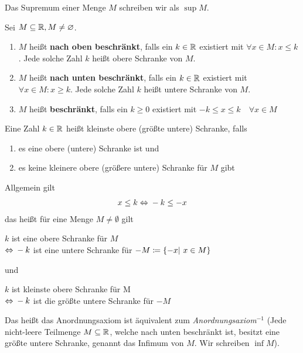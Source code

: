 \begin{notation}[Supremum]
    Das Supremum einer Menge $M$ schreiben wir als $\sup M$.
\end{notation}

\begin{definition}
    Sei $M\subseteq \mathbb{R}, M\neq \varnothing$.
    \begin{enumerate}[label=(\roman*)]
        \item $M$ heißt \textbf{nach oben beschränkt}, falls ein $k\in\mathbb{R}$ existiert mit $\forall x\in M\colon x\leq k$.
        Jede solche Zahl $k$ heißt obere Schranke von $M$.
        \item $M$ heißt \textbf{nach unten beschränkt}, falls ein $k\in\mathbb{R}$ existiert mit $\forall x\in M\colon x\geq k$.
        Jede solche Zahl $k$ heißt untere Schranke von $M$.
        \item $M$ heißt \textbf{beschränkt}, falls ein $k\geq 0$ existiert mit $-k\leq x \leq k\quad \forall x\in M$
    \end{enumerate}
\end{definition}

\begin{definition}
    Eine Zahl $k\in\mathbb{R}$ heißt kleinste obere (größte untere) Schranke, falls
    \begin{enumerate}
        \item es eine obere (untere) Schranke ist und
        \item es keine kleinere obere (größere untere) Schranke für $M$ gibt
    \end{enumerate}
\end{definition}

\begin{folgerung}
    \theoremescape
    Allgemein gilt
    \begin{align*}
        x \leq k \Leftrightarrow{} -k \leq -x
    \end{align*}
    das heißt für eine Menge $M\neq\emptyset$ gilt
    \begin{center}
        $k$ ist eine obere Schranke für $M$\\ $\Leftrightarrow{} -k$ ist eine untere Schranke für $-M\coloneqq\left\{-x|~x\in M\right\}$
    \end{center}
    und
    \begin{center}
        $k$ ist kleinste obere Schranke für M\\ $\Leftrightarrow{} -k$ ist die größte untere Schranke für $-M$
    \end{center}
    Das heißt das Anordnungsaxiom ist äquivalent zum \textit{Anordnungsaxiom}$^{-1}$ (Jede nicht-leere Teilmenge $M\subseteq \mathbb{R}$, welche nach unten beschränkt ist, besitzt eine größte untere Schranke, genannt das Infimum von $M$. Wir schreiben $\inf M$).
\end{folgerung}

